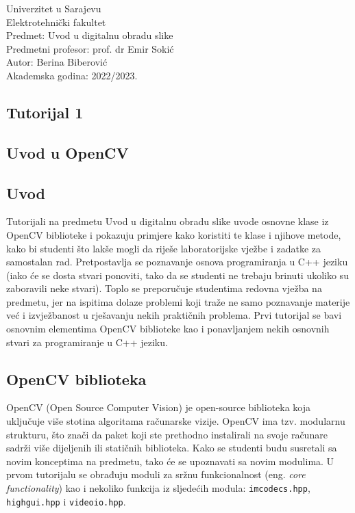 \documentclass[a4paper, 12pt]{article}
\begin{document}
\noindent
Univerzitet u Sarajevu\\
Elektrotehnički fakultet\\
Predmet: Uvod u digitalnu obradu slike\\
Predmetni profesor: prof. dr Emir Sokić\\
Autor: Berina Biberović\\
Akademska godina: 2022/2023.


\begin{center}
    \section*{Tutorijal 1}
    \subsection*{Uvod u OpenCV}
\end{center}

\subsection*{Uvod}

Tutorijali na predmetu Uvod u digitalnu obradu slike uvode osnovne klase iz OpenCV biblioteke i pokazuju primjere kako koristiti te klase i njihove metode, kako bi studenti što lakše mogli da riješe laboratorijske vježbe i zadatke za samostalan rad. Pretpostavlja se poznavanje osnova programiranja u C++ jeziku (iako će se dosta stvari ponoviti, tako da se studenti ne trebaju brinuti ukoliko su zaboravili neke stvari). Toplo se preporučuje studentima redovna vježba na predmetu, jer na ispitima dolaze problemi koji traže ne samo poznavanje materije već i izvježbanost u rješavanju nekih praktičnih problema. Prvi tutorijal se bavi osnovnim elementima OpenCV biblioteke kao i ponavljanjem nekih osnovnih stvari za programiranje u C++ jeziku.

\subsection*{OpenCV biblioteka}

OpenCV (Open Source Computer Vision) je open-source biblioteka koja uključuje više stotina algoritama računarske vizije. OpenCV ima tzv. modularnu strukturu, što znači da paket koji ste prethodno instalirali na svoje računare sadrži više dijeljenih ili statičnih biblioteka. Kako se studenti budu susretali sa novim konceptima na predmetu, tako će se upoznavati sa novim modulima. U prvom tutorijalu se obrađuju moduli za sržnu funkcionalnost (eng. \textit{core functionality}) kao i nekoliko funkcija iz sljedećih modula: \lstinline{imcodecs.hpp}, \lstinline{highgui.hpp} i \lstinline{videoio.hpp}.
\end{document}
